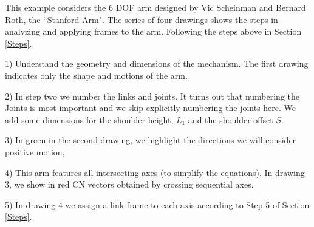 \begin{Example}

This example considers the 6 DOF arm designed by Vic Scheinman and Bernard Roth, the ``Stanford Arm".   The series of four drawings shows the steps in analyzing and applying frames to the arm.   Following the steps above in Section \ref{Steps}.

1) Understand the geometry and dimensions of the mechanism.  The first drawing indicates only the shape and motions of the arm.

2) In step two we number the links and joints.  It turns out that numbering the Joints is most important and we skip explicitly numbering the joints here. We add some dimensions for the shoulder height, $L_1$ and the shoulder offset $S$.

3) In green in the second drawing,  we highlight the directions we will consider positive motion,

4) This arm features all intersecting axes (to simplify the equations).  In drawing 3, we show in red CN vectors obtained by crossing sequential axes.

5) In drawing 4 we assign a link frame to each axis according to Step 5 of Section \ref{Steps}.


\end{Example}
